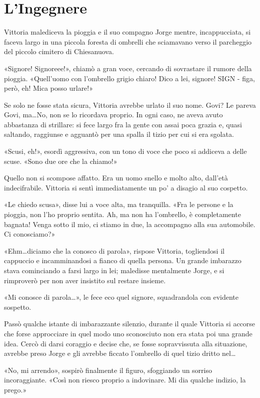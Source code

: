 \chapter{L'Ingegnere}


Vittoria malediceva la pioggia e il suo compagno Jorge mentre, incappucciata, si faceva largo in una piccola foresta di ombrelli che sciamavano verso il parcheggio del piccolo cimitero di Chiesanuova.

«Signore! Signoreee!», chiamò a gran voce, cercando di sovrastare il rumore della pioggia. «Quell'uomo con l'ombrello grigio chiaro! Dico a lei, signore! SIGN - figa, però, eh! Mica posso urlare!»

Se solo ne fosse stata sicura, Vittoria avrebbe urlato il suo nome. Govi? Le pareva Govi, ma\ldots No, non se lo ricordava proprio. In ogni caso, ne aveva avuto abbastanza di strillare: si fece largo fra la gente con assai poca grazia e, quasi saltando, raggiunse e agguantò per una spalla il tizio per cui si era sgolata.

«Scusi, eh!», esordì aggressiva, con un tono di voce che poco si addiceva a delle scuse. «Sono due ore che la chiamo!»

Quello non si scompose affatto. Era un uomo snello e molto alto, dall'età indecifrabile. Vittoria si sentì immediatamente un po' a disagio al suo cospetto.

«Le chiedo scusa», disse lui a voce alta, ma tranquilla. «Fra le persone e la pioggia, non l'ho proprio sentita. Ah, ma non ha l'ombrello, è completamente bagnata! Venga sotto il mio, ci stiamo in due, la accompagno alla sua automobile. Ci conosciamo?»

«Ehm\ldots diciamo che la conosco di parola», rispose Vittoria, togliendosi il cappuccio e incamminandosi a fianco di quella persona. Un grande imbarazzo stava cominciando a farsi largo in lei; maledisse mentalmente Jorge, e si rimproverò per non aver insistito sul restare insieme.

«Mi conosce di parola\ldots», le fece eco quel signore, squadrandola con evidente sospetto.

Passò qualche istante di imbarazzante silenzio, durante il quale Vittoria si accorse che forse approcciare in quel modo uno sconosciuto non era stata poi una grande idea. Cercò di darsi coraggio e decise che, se fosse sopravvissuta alla situazione, avrebbe preso Jorge e gli avrebbe ficcato l'ombrello di quel tizio dritto nel\ldots

«No, mi arrendo», sospirò finalmente il figuro, sfoggiando un sorriso incoraggiante. «Così non riesco proprio a indovinare. Mi dia qualche indizio, la prego.»

